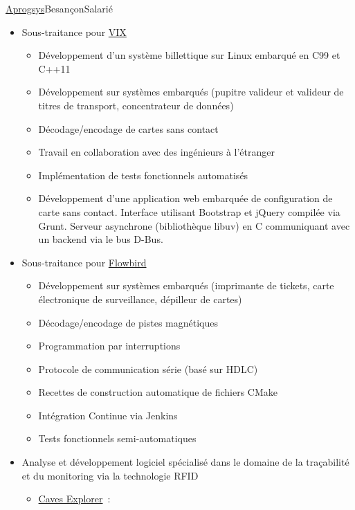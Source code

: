 \documentclass[11pt,a4paper,sans,french]{moderncv}
\begin{document}
{\href{https://www.aprogsys.com/}{Aprogsys}}{Besançon}{Salarié}{%
 \begin{itemize}
  \item Sous-traitance pour \href{http://vixtechnology.com/}{VIX}
        \begin{itemize}
         \item Développement d'un système billettique sur Linux embarqué
               en C99 et C++11
         \item Développement sur systèmes embarqués (pupitre valideur et
               valideur de titres de transport, concentrateur de données)
         \item Décodage/encodage de cartes sans contact
         \item Travail en collaboration avec des ingénieurs à l'étranger
         \item Implémentation de tests fonctionnels automatisés
         \item Développement d'une application web embarquée de configuration
               de carte sans contact.
               Interface utilisant Bootstrap et jQuery compilée via Grunt.
               Serveur asynchrone (bibliothèque libuv) en C communiquant avec
               un backend via le bus D-Bus.
        \end{itemize}
  \item Sous-traitance pour \href{http://flowbird.group/}{Flowbird}
        \begin{itemize}
         \item Développement sur systèmes embarqués (imprimante de tickets,
               carte électronique de surveillance, dépilleur de cartes)
         \item Décodage/encodage de pistes magnétiques
         \item Programmation par interruptions
         \item Protocole de communication série (basé sur HDLC)
         \item Recettes de construction automatique de fichiers CMake
         \item Intégration Continue via Jenkins
         \item Tests fonctionnels semi-automatiques
        \end{itemize}
  \item Analyse et développement logiciel spécialisé dans le domaine
        de la traçabilité et du monitoring via la technologie RFID
        \begin{itemize}
         \item \href{http://www.caves-explorer.com/}{Caves Explorer}~:

\end{itemize}
\end{itemize}}
\end{document}
